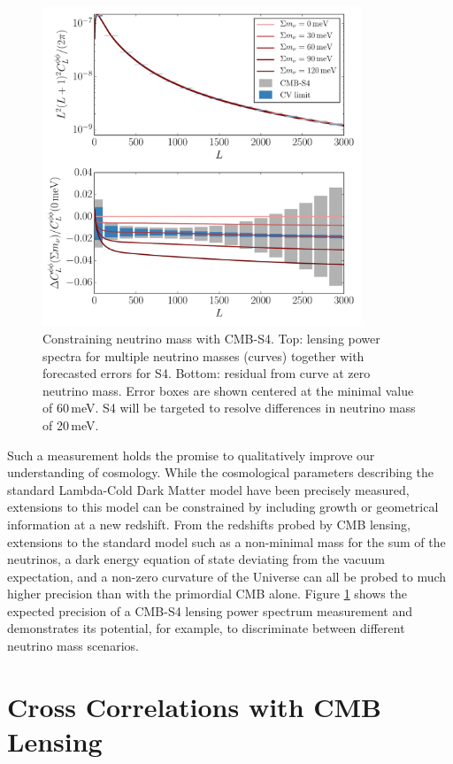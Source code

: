 \begin{figure}[htbp]
\centering
\includegraphics[width=0.85\textwidth]{CMBLensing/mnuS4errors.pdf}
\caption{Constraining neutrino mass with CMB-S4.  Top: lensing power spectra for multiple neutrino masses (curves) together with forecasted errors for S4.  Bottom: residual from curve at zero neutrino mass.  Error boxes are shown centered at the minimal value of $60$\,meV.  S4 will be targeted to resolve differences in neutrino mass of 20\,meV. }
\label{mnuS4errors}
\end{figure}

Such a measurement holds the promise to qualitatively improve our understanding of cosmology.  While the cosmological parameters describing the standard Lambda-Cold Dark Matter model have been precisely measured, extensions to this model can be constrained by including growth or geometrical information at a new redshift.  From the redshifts probed by CMB lensing, extensions to the standard model such as a non-minimal mass for the sum of the neutrinos, a dark energy equation of state deviating from the vacuum expectation, and a non-zero curvature of the Universe can all be probed to much higher precision than with the primordial CMB alone. Figure \ref{mnuS4errors} shows the expected precision of a CMB-S4 lensing power spectrum measurement and demonstrates its potential, for example, to discriminate between different neutrino mass scenarios. 



\section{Cross Correlations with CMB Lensing}\label{cross}

